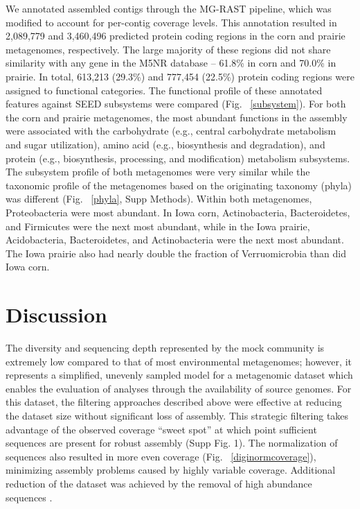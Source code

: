 \documentclass{nature}%
\begin{document}
We annotated assembled contigs through the MG-RAST pipeline, which
was modified to account for per-contig coverage levels.
This annotation resulted in 2,089,779 and 3,460,496 predicted protein
coding regions in the corn and prairie metagenomes, respectively.  The
large majority of these regions did not share similarity with any gene
in the M5NR database -- 61.8\% in corn and
70.0\% in prairie.  In total, 613,213 (29.3\%) and 777,454 (22.5\%)
protein coding regions were assigned to functional categories.  The
functional profile of these annotated features against SEED subsystems
were compared (Fig. ~\ref{subsystem}).  For both the corn and prairie
metagenomes, the most abundant functions in the assembly were
associated with the carbohydrate (e.g., central carbohydrate
metabolism and sugar utilization), amino acid (e.g., biosynthesis and
degradation), and protein (e.g., biosynthesis, processing, and
modification) metabolism subsystems.  The subsystem profile of both
metagenomes were very similar while the taxonomic profile of the
metagenomes based on the originating taxonomy (phyla) was different
(Fig. ~\ref{phyla}, Supp Methods).  Within both metagenomes,
Proteobacteria were most abundant.  In Iowa
corn, Actinobacteria, Bacteroidetes, and Firmicutes were
the next most abundant, while in the Iowa prairie, Acidobacteria,
Bacteroidetes, and Actinobacteria were the next most abundant.
The Iowa prairie also had nearly double the fraction
of Verruomicrobia than did Iowa corn.


\section*{Discussion}


The diversity and sequencing depth represented by the mock community
is extremely low compared to that of most environmental metagenomes;
however, it represents a simplified, unevenly sampled model for a
metagenomic dataset which enables the evaluation of analyses through
the availability of source genomes.  For this dataset, the filtering
approaches described above were effective at reducing the dataset size
without significant loss of assembly.  This strategic filtering takes
advantage of the observed coverage ``sweet spot'' at which point
sufficient sequences are present for robust assembly (Supp Fig. 1).  
The normalization of sequences also resulted in
more even coverage (Fig. ~\ref{diginormcoverage}),
minimizing assembly problems caused by highly variable coverage.
Additional reduction of the dataset was achieved by the removal of
high abundance sequences \cite{howeartifacts}.
\end{document}
